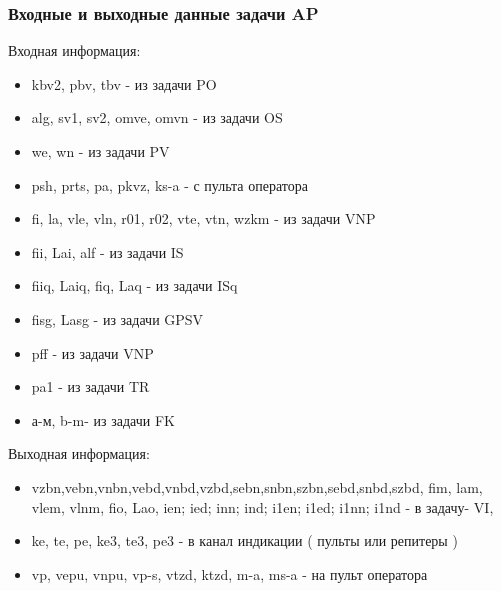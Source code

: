 \subsubsection{Входные и выходные данные задачи AP}
Входная информация:
\begin{itemize}
    \item kbv2,  pbv,  tbv - из задачи  PO
    \item alg, sv1, sv2, omve, omvn - из задачи  OS
    \item we, wn - из задачи  PV
    \item psh, prts, pa, pkvz, ks-a - с пульта оператора
    \item fi,  la, vle, vln, r01, r02,  vte, vtn,  wzkm - из задачи  VNP
    \item fii,  Lai, alf - из задачи  IS
    \item fiiq,  Laiq, fiq,  Laq - из задачи  ISq
    \item fisg,  Lasg - из задачи  GPSV
    \item pff - из задачи  VNP
    \item pa1 - из задачи  TR 
    \item а-м, b-m- из задачи  FK
\end{itemize}
Выходная информация:
\begin{itemize}
 \item vzbn,vebn,vnbn,vebd,vnbd,vzbd,sebn,snbn,szbn,sebd,snbd,szbd, fim, lam, vlem, vlnm,  fio,  Lao, ien;  ied;  inn;  
 ind;  i1en;  i1ed;  i1nn;  i1nd  - в задачу- VI,
 \item ke, te, pe, ke3, te3, pe3 - в  канал индикации ( пульты  или репитеры )
 \item vp, vepu, vnpu, vp-s, vtzd,  ktzd, m-a, ms-a -  на пульт оператора
\end{itemize}
